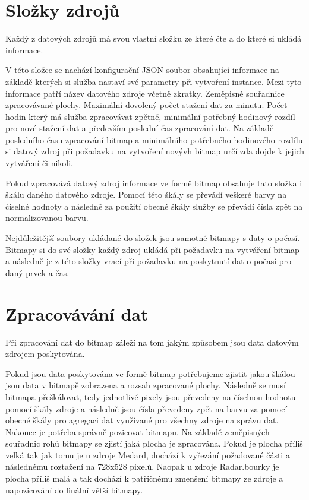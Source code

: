 \documentclass[czech,bachelor,dept460,male,csharp,cpdeclaration]{diploma}
\begin{document}
	\section{Složky zdrojů}
	
	Každý z datových zdrojů má svou vlastní složku ze které čte a do které si ukládá informace.
	
	V této složce se nachází konfigurační JSON soubor obsahující informace na základě kterých si služba nastaví své parametry při vytvoření instance. Mezi tyto informace patří název datového zdroje včetně zkratky. Zeměpisné souřadnice zpracovávané plochy. Maximální dovolený počet stažení dat za minutu. Počet hodin který má služba zpracovávat zpětně, minimální potřebný hodinový rozdíl pro nové stažení dat a především poslední čas zpracování dat. Na základě posledního času zpracování bitmap a minimálního potřebného hodinového rozdílu si datový zdroj při požadavku na vytvoření novývh bitmap určí zda dojde k jejich vytváření či nikoli.
	
	Pokud zpracovává datový zdroj informace ve formě bitmap obsahuje tato složka i škálu daného datového zdroje. Pomocí této škály se převádí veškeré barvy na číselné hodnoty a následně za použití obecné škály služby se převádí čísla zpět na normalizovanou barvu.
	
	Nejdůležitější soubory ukládané do složek jsou samotné bitmapy s daty o počasí. Bitmapy si do své složky každý zdroj ukládá při požadavku na vytváření bitmap a následně je z této složky vrací při požadavku na poskytnutí dat o počasí pro daný prvek a čas.
	
	\section{Zpracovávání dat}
	
	Při zpracování dat do bitmap záleží na tom jakým způsobem jsou data datovým zdrojem poskytována.
	
	Pokud jsou data poskytována ve formě bitmap potřebujeme zjistit jakou škálou jsou data v bitmapě zobrazena a rozsah zpracované plochy. Následně se musí bitmapa přeškálovat, tedy jednotlivé pixely jsou převedeny na číselnou hodnotu pomocí škály zdroje a následně jsou čísla převedeny zpět na barvu za pomocí obecné škály pro agregaci dat využívané pro všechny zdroje na správu dat. Nakonec je potřeba správně pozicovat bitmapu. Na základě zeměpisných souřadnic rohů bitmapy se zjistí jaká plocha je zpracována. Pokud je plocha příliš velká tak jak tomu je u zdroje Medard, dochází k vyřezání požadované části a následnému roztažení na 728x528 pixelů. Naopak u zdroje Radar.bourky je plocha příliš malá a tak dochází k patřičnému zmenšení bitmapy ze zdroje a napozicování do finální větší bitmapy.
	
\end{document}
